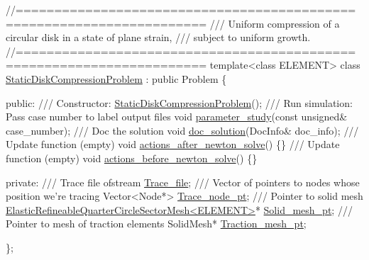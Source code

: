 \begin{DoxyCodeInclude}


\textcolor{comment}{//====================================================================== }\textcolor{comment}{}
\textcolor{comment}{/// Uniform compression of a circular disk in a state of plane strain,}
\textcolor{comment}{/// subject to uniform growth. }
\textcolor{comment}{}\textcolor{comment}{//====================================================================== }
\textcolor{keyword}{template}<\textcolor{keyword}{class} ELEMENT>
\textcolor{keyword}{class }\hyperlink{classStaticDiskCompressionProblem}{StaticDiskCompressionProblem} : \textcolor{keyword}{public} Problem
\{

\textcolor{keyword}{public}:
\textcolor{comment}{}
\textcolor{comment}{ /// Constructor:}
\textcolor{comment}{} \hyperlink{classStaticDiskCompressionProblem_a462e81aec225a5d6204b579719b3db87}{StaticDiskCompressionProblem}();
\textcolor{comment}{}
\textcolor{comment}{ /// Run simulation: Pass case number to label output files}
\textcolor{comment}{} \textcolor{keywordtype}{void} \hyperlink{classStaticDiskCompressionProblem_ac64db4786efde78e70b1110422331b02}{parameter\_study}(\textcolor{keyword}{const} \textcolor{keywordtype}{unsigned}& case\_number);
 \textcolor{comment}{}
\textcolor{comment}{ /// Doc the solution}
\textcolor{comment}{} \textcolor{keywordtype}{void} \hyperlink{classStaticDiskCompressionProblem_a9154152d022e86461966b5562f5acba4}{doc\_solution}(DocInfo& doc\_info);
\textcolor{comment}{}
\textcolor{comment}{ /// Update function (empty)}
\textcolor{comment}{} \textcolor{keywordtype}{void} \hyperlink{classStaticDiskCompressionProblem_a484b47d6a10a91cbd30cb807a49b1f58}{actions\_after\_newton\_solve}() \{\}
\textcolor{comment}{}
\textcolor{comment}{ /// Update function (empty)}
\textcolor{comment}{} \textcolor{keywordtype}{void} \hyperlink{classStaticDiskCompressionProblem_a2b00608d2992b40217248e01b2294153}{actions\_before\_newton\_solve}() \{\}

\textcolor{keyword}{private}:
\textcolor{comment}{}
\textcolor{comment}{ /// Trace file}
\textcolor{comment}{} ofstream \hyperlink{classStaticDiskCompressionProblem_a7affbfca1efcaadb4770386dc7d23e4c}{Trace\_file};
 \textcolor{comment}{}
\textcolor{comment}{ /// Vector of pointers to nodes whose position we're tracing}
\textcolor{comment}{} Vector<Node*> \hyperlink{classStaticDiskCompressionProblem_a8e98a225a1bb49cb6943b59d9f3145dc}{Trace\_node\_pt};
\textcolor{comment}{}
\textcolor{comment}{ /// Pointer to solid mesh}
\textcolor{comment}{} \hyperlink{classElasticRefineableQuarterCircleSectorMesh}{ElasticRefineableQuarterCircleSectorMesh<ELEMENT>}* 
      \hyperlink{classStaticDiskCompressionProblem_a6ad5b428d535a90f71e2e9325e9a5b15}{Solid\_mesh\_pt};
\textcolor{comment}{}
\textcolor{comment}{ /// Pointer to mesh of traction elements}
\textcolor{comment}{} SolidMesh* \hyperlink{classStaticDiskCompressionProblem_a66623722b4cb3bdc94d46a56c18d2908}{Traction\_mesh\_pt};

\};

\end{DoxyCodeInclude}




